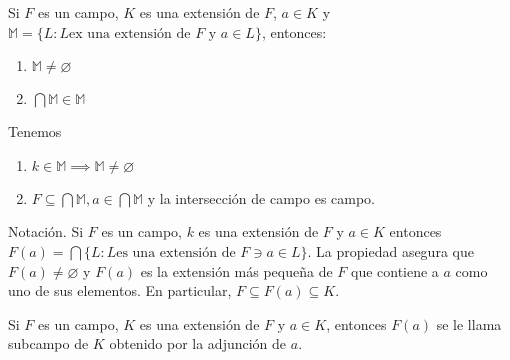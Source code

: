\begin{prop}
    Si $F$ es un campo, $K$ es una extensión de $F$, $a\in K$ y $\mathbb{M}=\{L:L \text{ex una extensión de $F$ y }a\in L\}$, entonces:
    \begin{enumerate}
        \item $\mathbb{M}\neq \varnothing$
        \item $\bigcap \mathbb{M}\in \mathbb{M}$
    \end{enumerate}
    \begin{dem}
        Tenemos
        \begin{enumerate}
            \item $k\in \mathbb{M}\implies \mathbb{M}\neq \varnothing$
            \item $F\subseteq \bigcap \mathbb{M},a\in \bigcap\mathbb{M}$ y la intersección de campo es campo. 
        \end{enumerate}
    \end{dem}
\end{prop}

\begin{cajita}
    \begin{nota}
        Notación. Si $F$ es un campo, $k$ es una extensión de $F$ y $a\in K$ entonces $F(a)=\bigcap\{L: L \text{es una extensión de $F$}\ni a\in L\}$. La propiedad asegura que $F(a)\neq\varnothing$ y $F(a)$ es la extensión más pequeña de $F$ que contiene a $a$ como uno de sus elementos. En particular, $F\subseteq F(a)\subseteq K$.  
    \end{nota}
\end{cajita}

\begin{definicion}
    Si $F$ es un campo, $K$ es una extensión de $F$ y $a\in K$, entonces $F(a)$ se le llama subcampo de $K$ obtenido por la adjunción de $a$.
\end{definicion}

